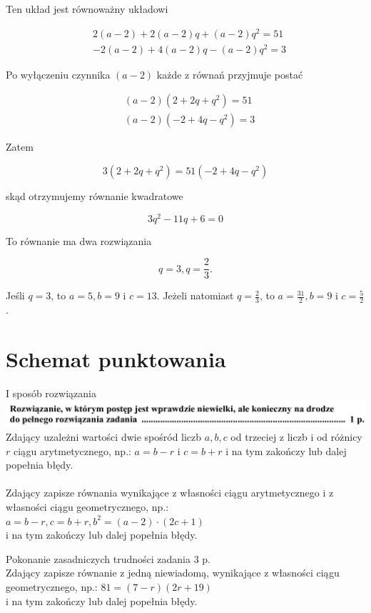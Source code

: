 \documentclass[10pt]{article}
\begin{document}
Ten układ jest równoważny układowi

$$
\begin{aligned}
& 2(a-2)+2(a-2) q+(a-2) q^{2}=51 \\
& -2(a-2)+4(a-2) q-(a-2) q^{2}=3
\end{aligned}
$$

Po wyłączeniu czynnika $(a-2)$ każde z równań przyjmuje postać

$$
\begin{aligned}
& (a-2)\left(2+2 q+q^{2}\right)=51 \\
& (a-2)\left(-2+4 q-q^{2}\right)=3
\end{aligned}
$$

Zatem

$$
3\left(2+2 q+q^{2}\right)=51\left(-2+4 q-q^{2}\right)
$$

skąd otrzymujemy równanie kwadratowe

$$
3 q^{2}-11 q+6=0
$$

To równanie ma dwa rozwiązania

$$
q=3, q=\frac{2}{3} .
$$

Jeśli $q=3$, to $a=5, b=9$ i $c=13$. Jeżeli natomiast $q=\frac{2}{3}$, to $a=\frac{31}{2}, b=9$ i $c=\frac{5}{2}$.

\section*{Schemat punktowania}
I sposób rozwiązania\\
\includegraphics[max width=\textwidth, center]{2025_02_07_cd06b1485e4d114dda29g-28}\\
Zdający uzależni wartości dwie spośród liczb $a, b, c$ od trzeciej z liczb i od różnicy $r$ ciągu arytmetycznego, np.: $a=b-r$ i $c=b+r$ i na tym zakończy lub dalej popełnia błędy.\\
$\qquad$\\
Zdający zapisze równania wynikające z własności ciągu arytmetycznego i z własności ciągu geometrycznego, np.: $a=b-r, c=b+r, b^{2}=(a-2) \cdot(2 c+1)$\\
i na tym zakończy lub dalej popełnia błędy.

Pokonanie zasadniczych trudności zadania 3 p.\\
Zdający zapisze równanie z jedną niewiadomą, wynikające z własności ciągu geometrycznego, np.: $81=(7-r)(2 r+19)$\\
i na tym zakończy lub dalej popełnia błędy.
\end{document}
